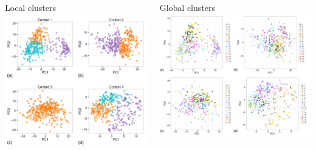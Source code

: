 \documentclass[t, final]{beamer}
\begin{document}
\begin{frame}{}
\begin{columns}[t]
\begin{column}{.32\linewidth}
\begin{block}{Local clusters}
  \includegraphics[width=\textwidth]{Figures/breast-PCA-local}
\end{block}

\end{column}


\begin{column}{.32\linewidth}

\begin{block}{Global clusters}
  \includegraphics[width=\textwidth]{Figures/breast-PCA}
\end{block}


\end{column}
\end{columns}
\end{frame}
\end{document}
